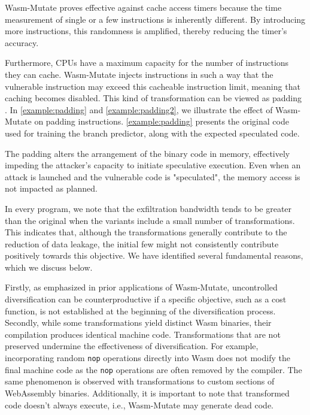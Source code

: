 \documentclass[sigplan,screen]{acmart}
\newcommand{\tool}{{\sc Wasm-Mutate}\xspace}
\newcommand{\wasm}{Wasm\xspace}
\newcommand{\Wasm}{WebAssembly\xspace}
\begin{document}


\tool proves effective against cache access timers because the time measurement of single or a few instructions is inherently different. 
By introducing more instructions, this randomness is amplified, thereby reducing the timer's accuracy.


Furthermore, CPUs have a maximum capacity for the number of instructions they can cache.
\tool injects instructions in such a way that the vulnerable instruction may exceed this cacheable instruction limit, meaning that caching becomes disabled.
This kind of transformation can be viewed as padding \cite{padding}.
In \autoref{example:padding} and \autoref{example:padding2}, we illustrate the effect of \tool on padding instructions.
\autoref{example:padding} presents the original code used for training the branch predictor, along with the expected speculated code.



The padding alters the arrangement of the binary code in memory, effectively impeding the attacker's capacity to initiate speculative execution.
Even when an attack is launched and the vulnerable code is "speculated", the memory access is not impacted as planned.


In every program, we note that the exfiltration bandwidth tends to be greater than the original when the variants include a small number of transformations.
This indicates that, although the transformations generally contribute to the reduction of data leakage, the initial few might not consistently contribute positively towards this objective.
We have identified several fundamental reasons, which we discuss below.

Firstly, as emphasized in prior applications of \tool \cite{CABRERAARTEAGA2023103296}, uncontrolled diversification can be counterproductive if a specific objective, such as a cost function, is not established at the beginning of the diversification process.
Secondly, while some transformations yield distinct \wasm binaries, their compilation produces identical machine code.
Transformations that are not preserved undermine the effectiveness of diversification.
For example, incorporating random \texttt{nop} operations directly into \wasm does not modify the final machine code as the \texttt{nop} operations are often removed by the compiler.
The same phenomenon is observed with transformations to custom sections of \Wasm binaries.
Additionally, it is important to note that transformed code doesn't always execute, i.e., \tool may generate dead code.
\end{document}
